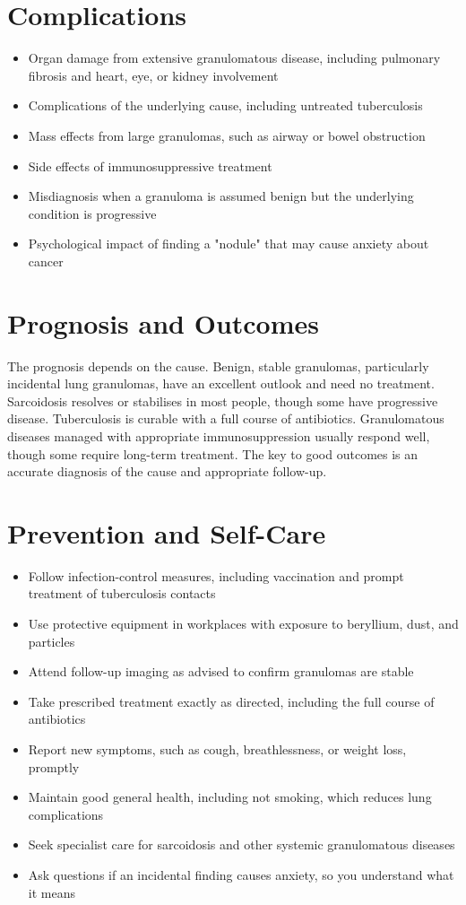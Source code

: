 \section*{Complications}
\begin{itemize}
    \item Organ damage from extensive granulomatous disease, including pulmonary fibrosis and heart, eye, or kidney involvement
    \item Complications of the underlying cause, including untreated tuberculosis
    \item Mass effects from large granulomas, such as airway or bowel obstruction
    \item Side effects of immunosuppressive treatment
    \item Misdiagnosis when a granuloma is assumed benign but the underlying condition is progressive
    \item Psychological impact of finding a "nodule" that may cause anxiety about cancer
\end{itemize}

\section*{Prognosis and Outcomes}
The prognosis depends on the cause. Benign, stable granulomas, particularly incidental lung granulomas, have an excellent outlook and need no treatment. Sarcoidosis resolves or stabilises in most people, though some have progressive disease. Tuberculosis is curable with a full course of antibiotics. Granulomatous diseases managed with appropriate immunosuppression usually respond well, though some require long-term treatment. The key to good outcomes is an accurate diagnosis of the cause and appropriate follow-up.

\section*{Prevention and Self-Care}
\begin{itemize}
    \item Follow infection-control measures, including vaccination and prompt treatment of tuberculosis contacts
    \item Use protective equipment in workplaces with exposure to beryllium, dust, and particles
    \item Attend follow-up imaging as advised to confirm granulomas are stable
    \item Take prescribed treatment exactly as directed, including the full course of antibiotics
    \item Report new symptoms, such as cough, breathlessness, or weight loss, promptly
    \item Maintain good general health, including not smoking, which reduces lung complications
    \item Seek specialist care for sarcoidosis and other systemic granulomatous diseases
    \item Ask questions if an incidental finding causes anxiety, so you understand what it means
\end{itemize}

